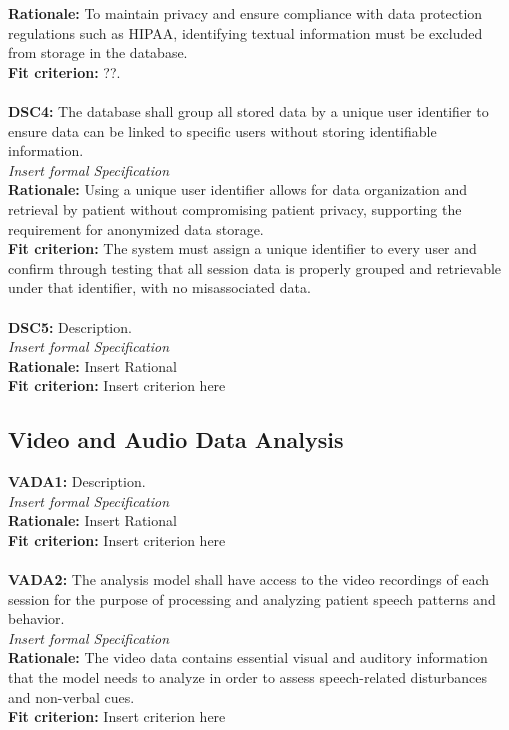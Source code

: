 \documentclass[12pt]{article}
\begin{document}
\textbf{Rationale: } To maintain privacy and ensure compliance with data protection regulations such as HIPAA, 
identifying textual information must be excluded from storage in the database.\\
\textbf{Fit criterion: } ??.\\\\
\textbf{DSC4: }The database shall group all stored data by a unique user identifier to ensure data can be linked to 
specific users without storing identifiable information.\\
\textit{Insert formal Specification}\\
\textbf{Rationale: } Using a unique user identifier allows for data organization and retrieval by patient without 
compromising patient privacy, supporting the requirement for anonymized data storage.\\
\textbf{Fit criterion: } The system must assign a unique identifier to every user and confirm through testing 
that all session data is properly grouped and retrievable under that identifier, with no misassociated data.\\\\
\textbf{DSC5: }Description.\\
\textit{Insert formal Specification}\\
\textbf{Rationale: } Insert Rational\\
\textbf{Fit criterion: } Insert criterion here\\

\subsection{Video and Audio Data Analysis}
\textbf{VADA1: } Description.\\
\textit{Insert formal Specification}\\
\textbf{Rationale: } Insert Rational\\
\textbf{Fit criterion: } Insert criterion here \\\\
\textbf{VADA2: } The analysis model shall have access to the video recordings of each session for the purpose of processing
 and analyzing patient speech patterns and behavior.\\
\textit{Insert formal Specification}\\
\textbf{Rationale: } The video data contains essential visual and auditory information that the model needs to analyze in order to assess speech-related disturbances and non-verbal cues.\\
\textbf{Fit criterion: } Insert criterion here \\\\
\end{document}
